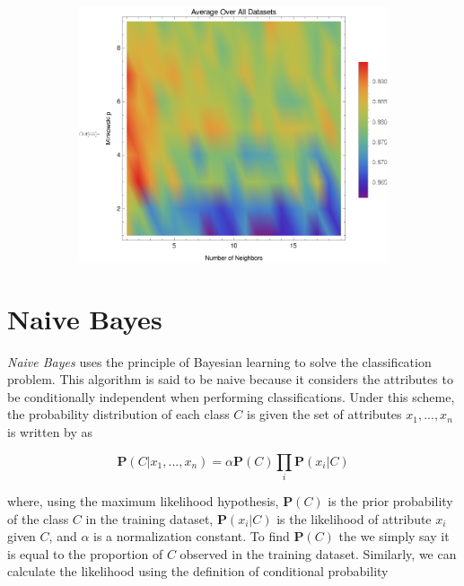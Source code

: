\documentclass{article}
\newcommand{\ve}[1]{\boldsymbol{\mathbf{#1}}}
\begin{document}
\begin{figure}[h!]
\begin{subfigure}[b]{0.32\textwidth}
					\includegraphics[width=\textwidth]{figs/kNN/average_plot_kp}	
					\caption{}
					\label{kp_ave}				
				\end{subfigure}
				\caption{}
				\label{kp_plot}
			\end{figure}
		
\section{Naive Bayes}
	\label{nbw}

	\textit{Naive Bayes} uses the principle of Bayesian learning to solve the classification problem. 
	This algorithm is said to be naive because it considers the attributes to be conditionally independent when performing classifications. 
	Under this scheme, the probability distribution of each class $C$ is given the set of attributes $x_1,...,x_n$ is written by \cite{ai} as
	
	\begin{equation}					
		\ve{P}(C|x_1,...,x_n) = \alpha \ve{P}(C) \prod_i \ve{P}(x_i| C)
		\label{nb_pd}
	\end{equation}
	
	where, using the maximum likelihood hypothesis, $\ve{P}(C)$ is the prior probability of the class $C$ in the training dataset, $\ve{P}(x_i|C)$ is the likelihood of attribute $x_i$ given $C$, and $\alpha$ is a normalization constant. 
	To find $\ve{P}(C)$ the we simply say it is equal to the proportion of $C$ observed in the training dataset. 
	Similarly, we can calculate the likelihood using the definition of conditional probability
	
\end{document}
